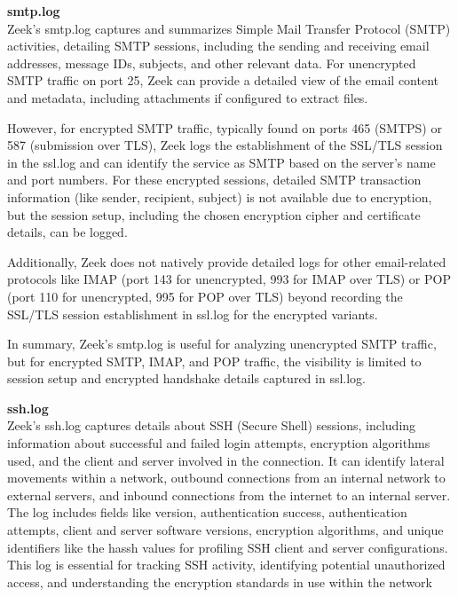 \noindent \Large \textbf{smtp.log}
\vspace{5pt}
\\
\normalsize
Zeek's \colorbox{gray!20}{smtp.log} captures and summarizes Simple Mail Transfer Protocol (SMTP) activities, detailing SMTP sessions, including the sending and receiving email addresses, message IDs, subjects, and other relevant data. For unencrypted SMTP traffic on port 25, Zeek can provide a detailed view of the email content and metadata, including attachments if configured to extract files.

However, for encrypted SMTP traffic, typically found on ports 465 (SMTPS) or 587 (submission over TLS), Zeek logs the establishment of the SSL/TLS session in the \colorbox{gray!20}{ssl.log} and can identify the service as SMTP based on the server's name and port numbers. For these encrypted sessions, detailed SMTP transaction information (like sender, recipient, subject) is not available due to encryption, but the session setup, including the chosen encryption cipher and certificate details, can be logged.

Additionally, Zeek does not natively provide detailed logs for other email-related protocols like IMAP (port 143 for unencrypted, 993 for IMAP over TLS) or POP (port 110 for unencrypted, 995 for POP over TLS) beyond recording the SSL/TLS session establishment in \colorbox{gray!20}{ssl.log} for the encrypted variants.

In summary, Zeek's \colorbox{gray!20}{smtp.log} is useful for analyzing unencrypted SMTP traffic, but for encrypted SMTP, IMAP, and POP traffic, the visibility is limited to session setup and encrypted handshake details captured in \colorbox{gray!20}{ssl.log}.
\\
\vspace{1cm}



\noindent \Large \textbf{ssh.log}
\vspace{5pt}
\\
\normalsize
Zeek's \colorbox{gray!20}{ssh.log} captures details about SSH (Secure Shell) sessions, including information about successful and failed login attempts, encryption algorithms used, and the client and server involved in the connection. It can identify lateral movements within a network, outbound connections from an internal network to external servers, and inbound connections from the internet to an internal server. The log includes fields like version, authentication success, authentication attempts, client and server software versions, encryption algorithms, and unique identifiers like the hassh values for profiling SSH client and server configurations. This log is essential for tracking SSH activity, identifying potential unauthorized access, and understanding the encryption standards in use within the network
\\
\vspace{1cm}


